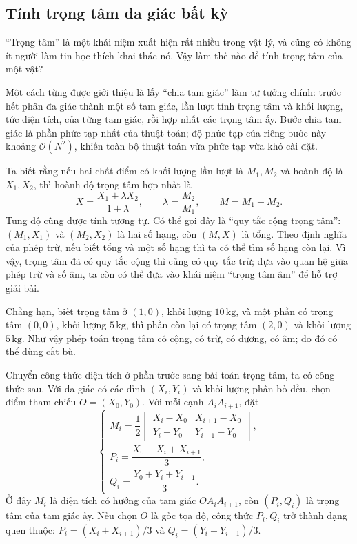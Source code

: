 \documentclass[11pt]{article}
\newcommand{\Oh}{\mathcal{O}}
\begin{document}
\subsection{Tính trọng tâm đa giác bất kỳ}

``Trọng tâm'' là một khái niệm xuất hiện rất nhiều trong vật lý, và cũng có
không ít người làm tin học thích khai thác nó. Vậy làm thế nào để tính trọng
tâm của một vật?

Một cách từng được giới thiệu là lấy ``chia tam giác'' làm tư tưởng chính:
trước hết phân đa giác thành một số tam giác, lần lượt tính trọng tâm và khối
lượng, tức diện tích, của từng tam giác, rồi hợp nhất các trọng tâm ấy. Bước
chia tam giác là phần phức tạp nhất của thuật toán; độ phức tạp của riêng bước
này khoảng $\Oh(N^2)$, khiến toàn bộ thuật toán vừa phức tạp vừa khó cài đặt.

Ta biết rằng nếu hai chất điểm có khối lượng lần lượt là $M_1,M_2$ và hoành độ
là $X_1,X_2$, thì hoành độ trọng tâm hợp nhất là
\[
  X=\frac{X_1+\lambda X_2}{1+\lambda},
  \qquad
  \lambda=\frac{M_2}{M_1},
  \qquad
  M=M_1+M_2.
\]
Tung độ cũng được tính tương tự. Có thể gọi đây là ``quy tắc cộng trọng tâm'':
$(M_1,X_1)$ và $(M_2,X_2)$ là hai số hạng, còn $(M,X)$ là tổng. Theo định nghĩa
của phép trừ, nếu biết tổng và một số hạng thì ta có thể tìm số hạng còn lại.
Vì vậy, trọng tâm đã có quy tắc cộng thì cũng có quy tắc trừ; dựa vào quan hệ
giữa phép trừ và số âm, ta còn có thể đưa vào khái niệm ``trọng tâm âm'' để
hỗ trợ giải bài.

Chẳng hạn, biết trọng tâm ở $(1,0)$, khối lượng $10\,\mathrm{kg}$, và một phần
có trọng tâm $(0,0)$, khối lượng $5\,\mathrm{kg}$, thì phần còn lại có trọng
tâm $(2,0)$ và khối lượng $5\,\mathrm{kg}$. Như vậy phép toán trọng tâm có
cộng, có trừ, có dương, có âm; do đó có thể dùng cắt bù.

Chuyển công thức diện tích ở phần trước sang bài toán trọng tâm, ta có công
thức sau. Với đa giác có các đỉnh $(X_i,Y_i)$ và khối lượng phân bố đều, chọn
điểm tham chiếu $O=(X_0,Y_0)$. Với mỗi cạnh $A_iA_{i+1}$, đặt
\[
\begin{cases}
  M_i =
  \dfrac12
  \begin{vmatrix}
    X_i-X_0 & X_{i+1}-X_0\\
    Y_i-Y_0 & Y_{i+1}-Y_0
  \end{vmatrix},\\[1.1em]
  P_i=\dfrac{X_0+X_i+X_{i+1}}{3},\\[0.8em]
  Q_i=\dfrac{Y_0+Y_i+Y_{i+1}}{3}.
\end{cases}
\]
Ở đây $M_i$ là diện tích có hướng của tam giác $OA_iA_{i+1}$, còn
$(P_i,Q_i)$ là trọng tâm của tam giác ấy. Nếu chọn $O$ là gốc tọa độ, công
thức $P_i,Q_i$ trở thành dạng quen thuộc:
$P_i=(X_i+X_{i+1})/3$ và $Q_i=(Y_i+Y_{i+1})/3$.
\end{document}
